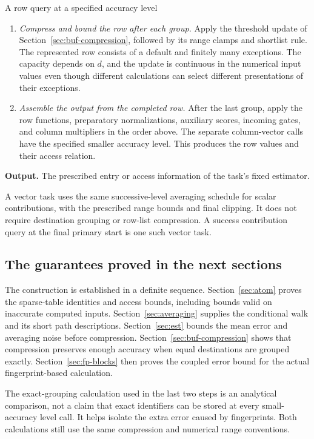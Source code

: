 \documentclass[11pt]{article}
\numberwithin{equation}{section}
\theoremstyle{definition}
\theoremstyle{remark}
\begin{document}
\begin{algorithm}[label=alg:entry-query]{A row query at a specified accuracy level}
\begin{enumerate}[leftmargin=*]
\item \emph{Compress and bound the row after each group.} Apply the threshold update of Section~\ref{sec:buf-compression}, followed by its range clamps and shortlist rule. The represented row consists of a default and finitely many exceptions. The capacity depends on $d$, and the update is continuous in the numerical input values even though different calculations can select different presentations of their exceptions.

\item \emph{Assemble the output from the completed row.} After the last group, apply the row functions, preparatory normalizations, auxiliary scores, incoming gates, and column multipliers in the order above. The separate column-vector calls have the specified smaller accuracy level. This produces the row values and their access relation.
\end{enumerate}
\textbf{Output.} The prescribed entry or access information of the task's fixed estimator.
\end{algorithm}

A vector task uses the same successive-level averaging schedule for scalar contributions, with the prescribed range bounds and final clipping. It does not require destination grouping or row-list compression. A success contribution query at the final primary start is one such vector task.

\subsection{The guarantees proved in the next sections}

The construction is established in a definite sequence. Section~\ref{sec:atom} proves the sparse-table identities and access bounds, including bounds valid on inaccurate computed inputs. Section~\ref{sec:averaging} supplies the conditional walk and its short path descriptions. Section~\ref{sec:est} bounds the mean error and averaging noise before compression. Section~\ref{sec:buf-compression} shows that compression preserves enough accuracy when equal destinations are grouped exactly. Section~\ref{sec:fp-blocks} then proves the coupled error bound for the actual fingerprint-based calculation.

The exact-grouping calculation used in the last two steps is an analytical comparison, not a claim that exact identifiers can be stored at every small-accuracy level call. It helps isolate the extra error caused by fingerprints. Both calculations still use the same compression and numerical range conventions.
\end{document}

